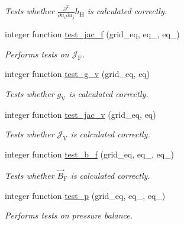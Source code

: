 \begin{DoxyCompactItemize}
\begin{DoxyCompactList}\small\item\em Tests whether $ \frac{\partial^2}{\partial u_i \partial u_j} h_\text{H} $ is calculated correctly. \end{DoxyCompactList}\item 
integer function \hyperlink{namespaceeq__ops_a05dcd4803b9c7845d3353614c9630c23}{test\+\_\+jac\+\_\+f} (grid\+\_\+eq, eq\+\_, eq\+\_)
\begin{DoxyCompactList}\small\item\em Performs tests on $ \mathcal{J}_\text{F}$. \end{DoxyCompactList}\item 
integer function \hyperlink{namespaceeq__ops_a9811c83477d9d85f7401fd7957a590fc}{test\+\_\+g\+\_\+v} (grid\+\_\+eq, eq)
\begin{DoxyCompactList}\small\item\em Tests whether $g_\text{V}$ is calculated correctly. \end{DoxyCompactList}\item 
integer function \hyperlink{namespaceeq__ops_aef40d04e93f6a96576f8fe893fb086f8}{test\+\_\+jac\+\_\+v} (grid\+\_\+eq, eq)
\begin{DoxyCompactList}\small\item\em Tests whether $\mathcal{J}_\text{V}$ is calculated correctly. \end{DoxyCompactList}\item 
integer function \hyperlink{namespaceeq__ops_a8082c12510696bd8ffdd0deef41860c2}{test\+\_\+b\+\_\+f} (grid\+\_\+eq, eq\+\_, eq\+\_)
\begin{DoxyCompactList}\small\item\em Tests whether $\vec{B}_\text{F}$ is calculated correctly. \end{DoxyCompactList}\item 
integer function \hyperlink{namespaceeq__ops_a38b723f6ed5d2e2772c9c3ad14d5ffd4}{test\+\_\+p} (grid\+\_\+eq, eq\+\_, eq\+\_)
\begin{DoxyCompactList}\small\item\em Performs tests on pressure balance. \end{DoxyCompactList}\end{DoxyCompactItemize}
